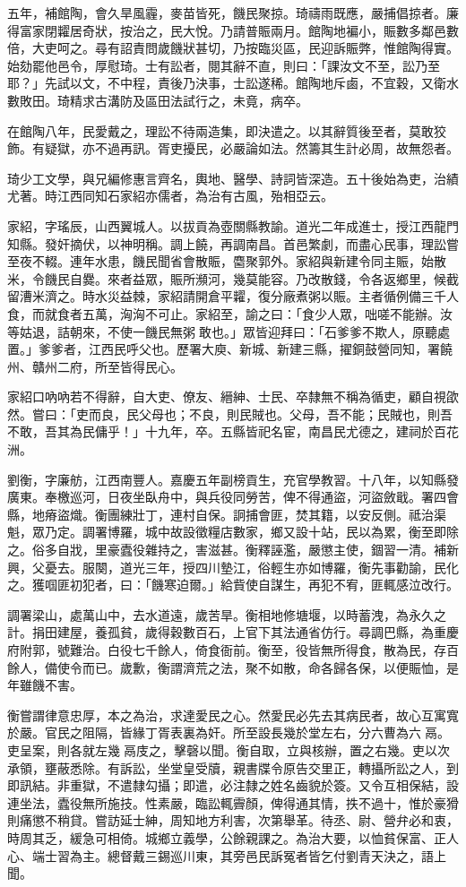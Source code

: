 \begin{pinyinscope}
五年，補館陶，會久旱風霾，麥苗皆死，饑民聚掠。琦禱雨既應，嚴捕倡掠者。廉得富家閉糶居奇狀，按治之，民大悅。乃請普賑兩月。館陶地褊小，賑數多鄰邑數倍，大吏呵之。尋有詔責問歲饑狀甚切，乃按臨災區，民迎訴賑弊，惟館陶得實。始劾罷他邑令，厚慰琦。士有訟者，閱其辭不直，則曰：「課汝文不至，訟乃至耶？」先試以文，不中程，責後乃決事，士訟遂稀。館陶地斥鹵，不宜穀，又衛水數敗田。琦精求古溝防及區田法試行之，未竟，病卒。

在館陶八年，民愛戴之，理訟不待兩造集，即決遣之。以其辭質後至者，莫敢狡飾。有疑獄，亦不過再訊。胥吏擾民，必嚴論如法。然籌其生計必周，故無怨者。

琦少工文學，與兄編修惠言齊名，輿地、醫學、詩詞皆深造。五十後始為吏，治績尤著。時江西同知石家紹亦儒者，為治有古風，殆相亞云。

家紹，字瑤辰，山西翼城人。以拔貢為壺關縣教諭。道光二年成進士，授江西龍門知縣。發奸摘伏，以神明稱。調上饒，再調南昌。首邑繁劇，而盡心民事，理訟嘗至夜不輟。連年水患，饑民聞省會散賑，麕聚郭外。家紹與新建令同主賑，始散米，令饑民自爨。來者益眾，賑所瀕河，幾莫能容。乃改散錢，令各返鄉里，候截留漕米濟之。時水災益棘，家紹請開倉平糶，復分廠煮粥以賑。主者循例備三千人食，而就食者五萬，洶洶不可止。家紹至，諭之曰：「食少人眾，咄嗟不能辦。汝等姑退，詰朝來，不使一饑民無粥敢也。」眾皆迎拜曰：「石爹爹不欺人，原聽處置。」爹爹者，江西民呼父也。歷署大庾、新城、新建三縣，擢銅鼓營同知，署饒州、贛州二府，所至皆得民心。

家紹口吶吶若不得辭，自大吏、僚友、縉紳、士民、卒隸無不稱為循吏，顧自視欿然。嘗曰：「吏而良，民父母也；不良，則民賊也。父母，吾不能；民賊也，則吾不敢，吾其為民傭乎！」十九年，卒。五縣皆祀名宦，南昌民尤德之，建祠於百花洲。

劉衡，字廉舫，江西南豐人。嘉慶五年副榜貢生，充官學教習。十八年，以知縣發廣東。奉檄巡河，日夜坐臥舟中，與兵役同勞苦，俾不得通盜，河盜斂戢。署四會縣，地瘠盜熾。衡團練壯丁，連村自保。詗捕會匪，焚其籍，以安反側。祗治渠魁，眾乃定。調署博羅，城中故設徵糧店數家，鄉又設十站，民以為累，衡至即除之。俗多自戕，里豪蠹役雜持之，害滋甚。衡釋誣濫，嚴懲主使，錮習一清。補新興，父憂去。服闋，道光三年，授四川墊江，俗輕生亦如博羅，衡先事勸諭，民化之。獲啯匪初犯者，曰：「饑寒迫爾。」給貲使自謀生，再犯不宥，匪輒感泣改行。

調署梁山，處萬山中，去水道遠，歲苦旱。衡相地修塘堰，以時蓄洩，為永久之計。捐田建屋，養孤貧，歲得穀數百石，上官下其法通省仿行。尋調巴縣，為重慶府附郭，號難治。白役七千餘人，倚食衙前。衡至，役皆無所得食，散為民，存百餘人，備使令而已。歲歉，衡謂濟荒之法，聚不如散，命各歸各保，以便賑恤，是年雖饑不害。

衡嘗謂律意忠厚，本之為治，求達愛民之心。然愛民必先去其病民者，故心互寓寬於嚴。官民之阻隔，皆緣丁胥表裏為奸。所至設長幾於堂左右，分六曹為六鬲。吏呈案，則各就左幾鬲庋之，擊磬以聞。衡自取，立與核辦，置之右幾。吏以次承領，壅蔽悉除。有訴訟，坐堂皇受牘，親書牒令原告交里正，轉攝所訟之人，到即訊結。非重獄，不遣隸勾攝；即遣，必注隸之姓名齒貌於簽。又令互相保結，設連坐法，蠹役無所施技。性素嚴，臨訟輒霽顏，俾得通其情，抶不過十，惟於豪猾則痛懲不稍貸。嘗訪延士紳，周知地方利害，次第舉革。待丞、尉、營弁必和衷，時周其乏，緩急可相倚。城鄉立義學，公餘親課之。為治大要，以恤貧保富、正人心、端士習為主。總督戴三錫巡川東，其旁邑民訴冤者皆乞付劉青天決之，語上聞。


\end{pinyinscope}
